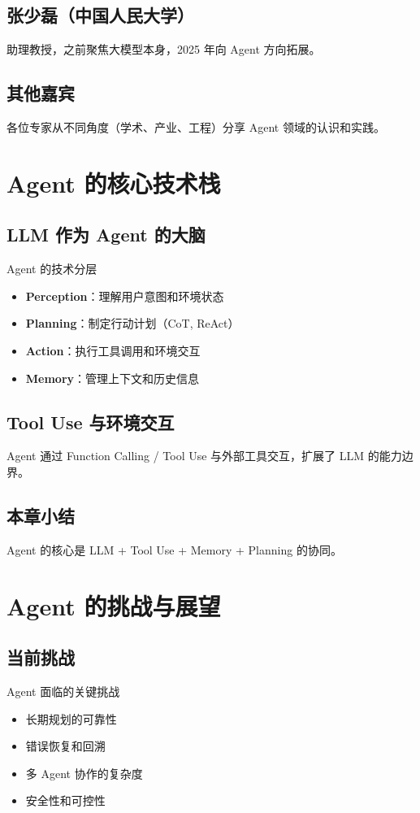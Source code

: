 \documentclass[a4paper]{article}
\begin{document}
\subsection{张少磊（中国人民大学）}
助理教授，之前聚焦大模型本身，2025 年向 Agent 方向拓展。

\subsection{其他嘉宾}
各位专家从不同角度（学术、产业、工程）分享 Agent 领域的认识和实践。

\section{Agent 的核心技术栈}

\subsection{LLM 作为 Agent 的大脑}
\begin{knowledgebox}{Agent 的技术分层}
\begin{itemize}
  \item \textbf{Perception}：理解用户意图和环境状态
  \item \textbf{Planning}：制定行动计划（CoT, ReAct）
  \item \textbf{Action}：执行工具调用和环境交互
  \item \textbf{Memory}：管理上下文和历史信息
\end{itemize}
\end{knowledgebox}

\subsection{Tool Use 与环境交互}
Agent 通过 Function Calling / Tool Use 与外部工具交互，扩展了 LLM 的能力边界。

\subsection{本章小结}
Agent 的核心是 LLM + Tool Use + Memory + Planning 的协同。

\section{Agent 的挑战与展望}

\subsection{当前挑战}
\begin{warningbox}{Agent 面临的关键挑战}
\begin{itemize}
  \item 长期规划的可靠性
  \item 错误恢复和回溯
  \item 多 Agent 协作的复杂度
  \item 安全性和可控性
\end{itemize}
\end{warningbox}
\end{document}
